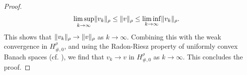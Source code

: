 \documentclass[reqno,11pt]{amsart}
\numberwithin{equation}{section}
\theoremstyle{thmlemcorr}
\numberwithin{theorem}{section}
\theoremstyle{thmlemcorr*}
\theoremstyle{defi}
\theoremstyle{remexample}
\theoremstyle{ass}
\newcommand{\N}{\mathbb{N}}
\newcommand{\R}{\mathbb{R}}
\DeclarePairedDelimiter{\norm}{\lVert}{\rVert}
\newcommand{\1}{\mathds{1}}
\newcommand{\Om}{\Omega}
\newcommand{\dl}{\,\mathrm{d}}
\newcommand{\seq}[1]{(#1_k)_{k}}
\begin{document}
\begin{proof}
    \[
    \limsup_{k \to \infty} \norm{v_k}_\rho \leq \norm{v}_\rho \leq \liminf_{k \to \infty} \norm{v_k}_\rho.
    \]
    This shows that \(\norm{v_k}_\rho\to \norm{v}_\rho\) as $k \to \infty$. Combining this with the weak convergence in $H^\rho_{\#,0}$, and using the Radon-Riesz property of uniformly convex Banach spaces (cf. \cite[Proposition~3.32]{Bre11}), we find that $v_k \to v$ in $H^\rho_{\#,0}$ as $k \to \infty$. This concludes the proof.
  

\end{proof}
\end{document}
